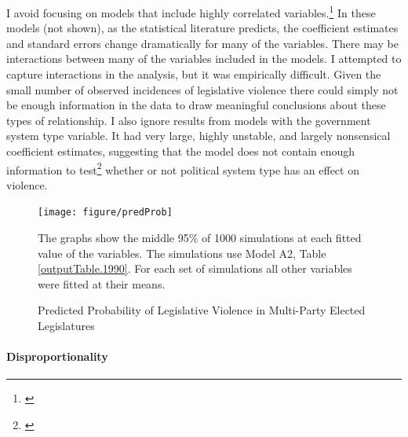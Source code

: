 \documentclass[a4paper]{article}\usepackage[]{graphicx}\usepackage[]{color}
\newenvironment{knitrout}{}{} %
\begin{document}
I avoid focusing on models that include highly correlated variables.\footnote{\citealt{Achen2002, Schrodt2006}} In these models (not shown), as the statistical literature predicts, the coefficient estimates and standard errors change dramatically for many of the variables. There may be interactions between many of the variables included in the models. I attempted to capture interactions in the analysis, but it was empirically difficult. Given the small number of observed incidences of legislative violence there could simply not be enough information in the data to draw meaningful conclusions about these types of relationship.{\citealt{Brambor2006}} I also ignore results from models with the government system type variable. It had very large, highly unstable, and largely nonsensical coefficient estimates, suggesting that the model does not contain enough information to test\footnote{\citealt{Babyak2004}} whether or not political system type has an effect on violence.

\begin{figure}[t]
    \caption{Predicted Probability of Legislative Violence in Multi-Party Elected Legislatures}  
    \label{pred_prob}
    \begin{center}


\begin{knitrout}
\color{fgcolor}
\texttt{[image: figure/predProb]} 

\end{knitrout}

    \end{center}
    \begin{singlespace}
      {\scriptsize{The graphs show the middle 95\% of 1000 simulations at each fitted value of the variables. The simulations use Model A2, Table \ref{outputTable.1990}. For each set of simulations all other variables were fitted at their means.}}
    \end{singlespace}
\end{figure}

\paragraph{Disproportionality}
\end{document}
